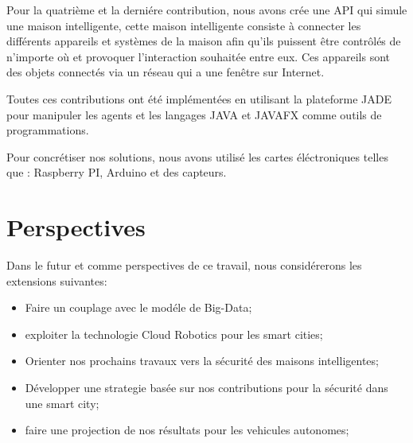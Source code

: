 Pour la quatrième et la derniére contribution, nous avons  crée  une API qui simule une maison intelligente, cette maison intelligente consiste à connecter les différents appareils et systèmes de la maison afin qu’ils puissent être contrôlés de n’importe où et provoquer l’interaction souhaitée entre eux. Ces appareils sont des objets connectés via un réseau qui a une fenêtre sur Internet. 

Toutes ces contributions ont été implémentées en utilisant la plateforme JADE pour manipuler les agents et les langages JAVA et JAVAFX comme outils de programmations. 

Pour concrétiser nos solutions, nous avons utilisé les cartes éléctroniques telles que : Raspberry PI, Arduino et des capteurs.



\section*{Perspectives}
Dans le futur et comme perspectives de ce travail, nous considérerons les extensions suivantes:
\begin{itemize}
   \item Faire un couplage avec le modéle de Big-Data; 
   \item exploiter la technologie Cloud Robotics pour les smart cities;
   \item Orienter nos prochains travaux vers la sécurité des maisons intelligentes;
   \item Développer une strategie basée sur nos contributions pour la sécurité dans une smart city;
   \item faire une projection de nos résultats pour les vehicules autonomes;

\end{itemize}
